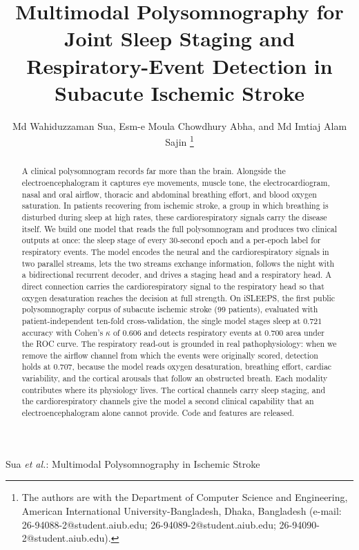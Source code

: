 \documentclass[journal]{IEEEtran}
\newcommand{\mmAcc}{0.721}   %
\newcommand{\mmK}{0.606}     %
\newcommand{\mmAuc}{0.700}   %
\newcommand{\noflowAuc}{0.707} %
\begin{document}
\title{Multimodal Polysomnography for Joint Sleep Staging and Respiratory-Event Detection in Subacute Ischemic Stroke}

\author{Md Wahiduzzaman Sua, Esm-e Moula Chowdhury Abha, and Md Imtiaj Alam Sajin%
\thanks{The authors are with the Department of Computer Science and Engineering,
American International University-Bangladesh, Dhaka, Bangladesh
(e-mail: 26-94088-2@student.aiub.edu; 26-94089-2@student.aiub.edu;
26-94090-2@student.aiub.edu).}}

%
{Sua \MakeLowercase{\textit{et al.}}: Multimodal Polysomnography in Ischemic Stroke}

\maketitle

\begin{abstract}
A clinical polysomnogram records far more than the brain. Alongside the
electroencephalogram it captures eye movements, muscle tone, the electrocardiogram,
nasal and oral airflow, thoracic and abdominal breathing effort, and blood oxygen
saturation. In patients recovering from ischemic stroke, a group in which breathing is
disturbed during sleep at high rates, these cardiorespiratory signals carry the disease
itself. We build one model that reads the full polysomnogram and produces two clinical
outputs at once: the sleep stage of every 30-second epoch and a per-epoch label for
respiratory events. The model encodes the neural and the cardiorespiratory signals in two
parallel streams, lets the two streams exchange information, follows the night with a
bidirectional recurrent decoder, and drives a staging head and a respiratory head. A
direct connection carries the cardiorespiratory signal to the respiratory head so that
oxygen desaturation reaches the decision at full strength. On iSLEEPS, the first public
polysomnography corpus of subacute ischemic stroke (99 patients), evaluated with
patient-independent ten-fold cross-validation, the single model stages sleep at $\mmAcc$
accuracy with Cohen's $\kappa$ of $\mmK$ and detects respiratory events at $\mmAuc$ area
under the ROC curve. The respiratory read-out is grounded in real pathophysiology: when we
remove the airflow channel from which the events were originally scored, detection holds
at $\noflowAuc$, because the model reads oxygen desaturation, breathing effort, cardiac
variability, and the cortical arousals that follow an obstructed breath. Each modality
contributes where its physiology lives. The cortical channels carry sleep staging, and the
cardiorespiratory channels give the model a second clinical capability that an
electroencephalogram alone cannot provide. Code and features are released.
\end{abstract}
\end{document}
